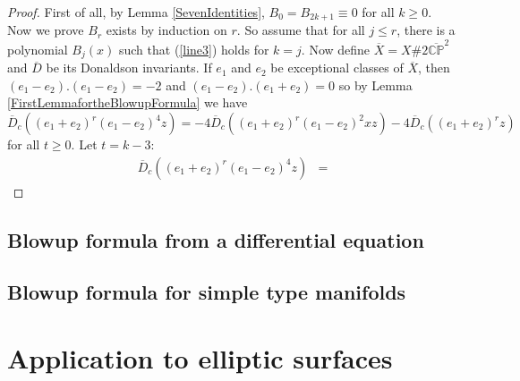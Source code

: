 \documentclass[a4paper]{article}
\newcommand{\C}{\mathbb{C}}
\renewcommand{\P}{\mathbb{P}}
\theoremstyle{definition}
\numberwithin{theorem}{subsection}
\begin{document}
\begin{proof}
First of all, by Lemma \ref{SevenIdentities}, $B_{0}=B_{2k+1}\equiv 0$ for all $k\geq 0$. Now we prove $B_{r}$ exists by induction on $r$. So assume that for all $j\leq r$, there is a polynomial $B_{j}(x)$ such that (\ref{line3}) holds for $k=j$. Now define $\overline{X}=X\#2\overline{\C\P}^2$ and $\overline{D}$ be its Donaldson invariants. If $e_{1}$ and $e_{2}$ be exceptional classes of $\overline{X}$, then $(e_{1}-e_{2}).(e_{1}-e_{2})=-2$ and  $(e_{1}-e_{2}).(e_{1}+e_{2})=0$ so by Lemma \ref{FirstLemmafortheBlowupFormula} we have
\begin{equation*}
    \overline{D}_{c}((e_1+e_2)^r(e_1-e_2)^4z)=-4\overline{D}_{c}((e_1+e_2)^r(e_1-e_2)^2xz)-4\overline{D}_{c}((e_1+e_2)^rz)
\end{equation*}
for all $t\geq 0$. Let $t=k-3$:
\begin{align*}
\overline{D}_{c}((e_1+e_2)^r(e_1-e_2)^4z) &=     
\end{align*}
\end{proof}

\subsection{Blowup formula from a differential equation}


\subsection{Blowup formula for simple type manifolds}

\section{Application to elliptic surfaces}







\end{document}

